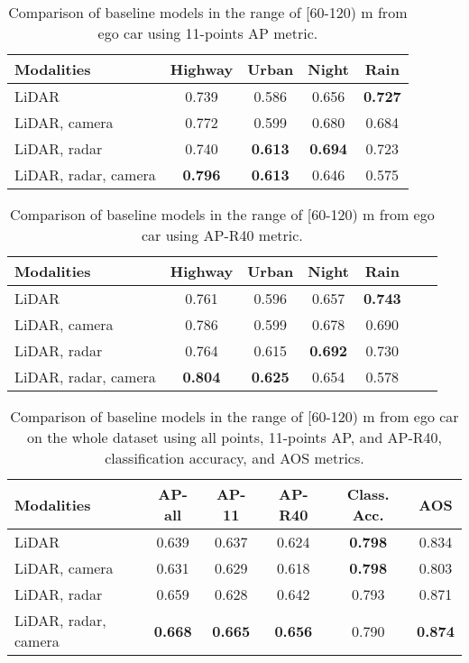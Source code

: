 \documentclass{article}
\begin{document}
\begin{table*}[!h]
  \small
  \centering
  \begin{tabular}{@{}l|cccc@{}}
    \toprule
    Modalities          & Highway   & Urban     & Night     & Rain \\
    \midrule
    LiDAR               & 0.739     & 0.586     & 0.656     & \bf{0.727} \\
    LiDAR, camera       & 0.772     & 0.599     & 0.680     & 0.684 \\
    LiDAR, radar        & 0.740     & \bf{0.613}& \bf{0.694}& 0.723 \\
    LiDAR, radar, camera &\bf{0.796}& \bf{0.613}& 0.646     & 0.575 \\
    \bottomrule
  \end{tabular}
  \caption{Comparison of baseline models in the range of [60-120) m from ego car using 11-points AP metric.}
  \label{tab:metrics9}
\end{table*}

\begin{table*}[!h]
  \small
  \centering
  \begin{tabular}{@{}l|cccccc@{}}
    \toprule
    Modalities          & Highway   & Urban     & Night     & Rain \\
    \midrule
    LiDAR               & 0.761     & 0.596     & 0.657     & \bf{0.743} \\
    LiDAR, camera       & 0.786     & 0.599     & 0.678     & 0.690 \\
    LiDAR, radar        & 0.764     & 0.615     & \bf{0.692}& 0.730 \\
    LiDAR, radar, camera &\bf{0.804}&\bf{0.625} & 0.654     & 0.578 \\
    \bottomrule
  \end{tabular}
  \caption{Comparison of baseline models in the range of [60-120) m from ego car using AP-R40 metric.}
  \label{tab:metrics10}
\end{table*}

\begin{table*}[!h]
  \small
  \centering
  \begin{tabular}{@{}l|ccccc@{}}
    \toprule
    Modalities          & AP-all    & AP-11     & AP-R40    & Class. Acc.   & AOS\\
    \midrule
    LiDAR               & 0.639     & 0.637     & 0.624     & \bf{0.798}    & 0.834 \\
    LiDAR, camera       & 0.631     & 0.629     & 0.618     & \bf{0.798}    & 0.803 \\
    LiDAR, radar        & 0.659     & 0.628     & 0.642     & 0.793         & 0.871 \\
    LiDAR, radar, camera &\bf{0.668}& \bf{0.665}& \bf{0.656}& 0.790         & \bf{0.874} \\
    \bottomrule
  \end{tabular}
  \caption{Comparison of baseline models in the range of [60-120) m from ego car on the whole dataset using all points, 11-points AP, and AP-R40, classification accuracy, and AOS metrics.}
  \label{tab:metrics_60_120_all}
\end{table*}
\end{document}
